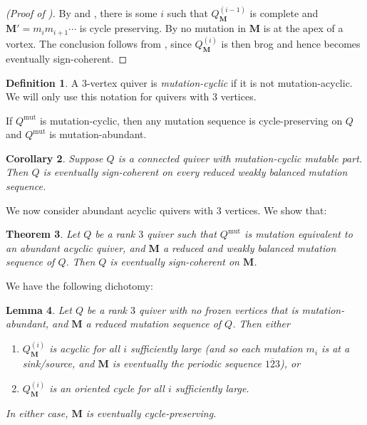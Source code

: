 \documentclass[12pt]{amsart}
\newtheorem{thm}{Theorem}[section]
\newtheorem{cor}[thm]{Corollary}
\newtheorem{lem}[thm]{Lemma}
\theoremstyle{definition}
\newtheorem{definition}[thm]{Definition}
\theoremstyle{remark}
\numberwithin{equation}{section}
\newcommand{\mut} {\text{mut}}
\begin{document}
\begin{proof}[({Proof of })]
By  and , there is some $i$ such that $Q^{(i-1)}_{\mathbf M}$ is complete and $\mathbf M' = m_im_{i+1}\cdots$ is cycle preserving.
By  no mutation in $\mathbf M$ is at the apex of a vortex.
The conclusion follows from , since $Q^{(i)}_{\mathbf M}$ is then brog and hence becomes eventually sign-coherent.
\end{proof}


\begin{definition}
A $3$-vertex quiver is \emph{mutation-cyclic} if it is not mutation-acyclic. We will only use this notation for quivers with $3$ vertices.

If $Q^{\mut}$ is mutation-cyclic, then any mutation sequence is cycle-preserving on $Q$ and $Q^{\mut}$ is mutation-abundant.
\end{definition}

\begin{cor}
\label{cor: mutation cyclic eventually sign coherent}
Suppose $Q$ is a connected quiver with mutation-cyclic mutable part.
Then $Q$ is eventually sign-coherent on every reduced weakly balanced mutation sequence.
\end{cor}

We now consider abundant acyclic quivers with $3$ vertices. We show that:

\begin{thm}
Let $Q$ be a rank $3$ quiver such that $Q^{\mut}$ is mutation equivalent to an abundant acyclic quiver, and $\mathbf M$ a reduced and weakly balanced mutation sequence of $Q$.
Then $Q$ is eventually sign-coherent on $\mathbf M$.
\end{thm}

We have the following dichotomy:

\begin{lem}
\label{lem:acyclic eventually cycle-preserving too}
Let $Q$ be a rank $3$ quiver with no frozen vertices that is mutation-abundant, and $\mathbf M$ a reduced mutation sequence of $Q$.
Then either 
\begin{enumerate}
\item $Q^{(i)}_{\mathbf M}$ is acyclic for all $i$ sufficiently large (and so each mutation $m_i$ is at a sink/source, and $\mathbf M$ is eventually the periodic sequence $\overline{123}$), or
\item $Q^{(i)}_{\mathbf M}$ is an oriented cycle for all $i$ sufficiently large.
\end{enumerate}
In either case, $\mathbf M$ is eventually cycle-preserving.
\end{lem}
\end{document}
